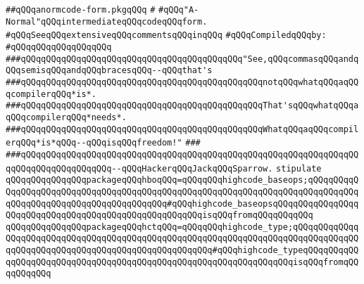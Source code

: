 \label{src/lib/compiler/back/top/anormcode/anormcode-form.pkg}
\verb|##qQQqanormcode-form.pkgqQQq|\newline
\verb|#|\newline
\verb|#qQQq"A-Normal"qQQqintermediateqQQqcodeqQQqform.|\newline
\verb|#qQQqSeeqQQqextensiveqQQqcommentsqQQqinqQQq|\newline
\newline
\verb|#qQQqCompiledqQQqby:|\newline
\verb|#qQQqqQQqqQQqqQQqqQQq|\newline
\newline
\verb|###qQQqqQQqqQQqqQQqqQQqqQQqqQQqqQQqqQQqqQQqqQQq"See,qQQqcommasqQQqandqQQqsemisqQQqandqQQqbracesqQQq--qQQqthat's|\newline
\verb|###qQQqqQQqqQQqqQQqqQQqqQQqqQQqqQQqqQQqqQQqqQQqqQQqnotqQQqwhatqQQqaqQQqcompilerqQQq*is*.|\newline
\verb|###qQQqqQQqqQQqqQQqqQQqqQQqqQQqqQQqqQQqqQQqqQQqqQQqThat'sqQQqwhatqQQqaqQQqcompilerqQQq*needs*.|\newline
\verb|###qQQqqQQqqQQqqQQqqQQqqQQqqQQqqQQqqQQqqQQqqQQqqQQqWhatqQQqaqQQqcompilerqQQq*is*qQQq--qQQqisqQQqfreedom!"|\newline
\verb|###|\newline
\verb|###qQQqqQQqqQQqqQQqqQQqqQQqqQQqqQQqqQQqqQQqqQQqqQQqqQQqqQQqqQQqqQQqqQQqqQQqqQQqqQQqqQQqqQQq--qQQqHackerqQQqJackqQQqSparrow.|\newline
\newline
\newline
\verb|stipulate|\newline
\verb|qQQqqQQqqQQqqQQqpackageqQQqhboqQQq=qQQqqQQqhighcode_baseops;qQQqqQQqqQQqqQQqqQQqqQQqqQQqqQQqqQQqqQQqqQQqqQQqqQQqqQQqqQQqqQQqqQQqqQQqqQQqqQQqqQQqqQQqqQQqqQQqqQQqqQQqqQQqqQQq#qQQqhighcode_baseopsqQQqqQQqqQQqqQQqqQQqqQQqqQQqqQQqqQQqqQQqqQQqqQQqqQQqqQQqisqQQqfromqQQqqQQqqQQq|\newline
\verb|qQQqqQQqqQQqqQQqpackageqQQqhctqQQq=qQQqqQQqhighcode_type;qQQqqQQqqQQqqQQqqQQqqQQqqQQqqQQqqQQqqQQqqQQqqQQqqQQqqQQqqQQqqQQqqQQqqQQqqQQqqQQqqQQqqQQqqQQqqQQqqQQqqQQqqQQqqQQqqQQqqQQqqQQq#qQQqhighcode_typeqQQqqQQqqQQqqQQqqQQqqQQqqQQqqQQqqQQqqQQqqQQqqQQqqQQqqQQqqQQqqQQqqQQqisqQQqfromqQQqqQQqqQQq|\newline
